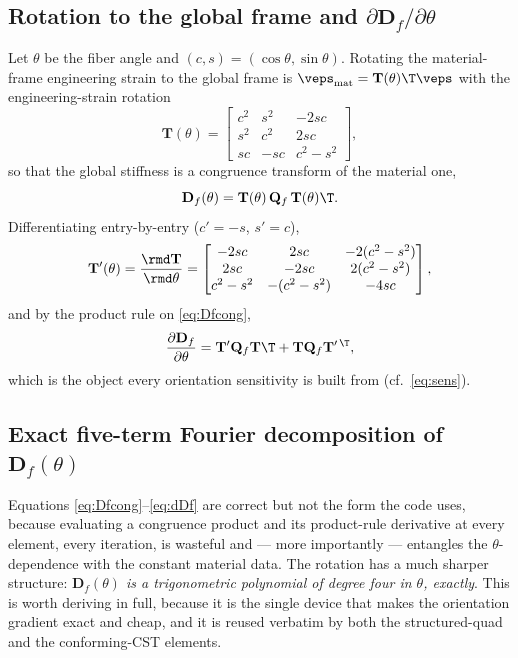 \documentclass[11pt]{article}
\begin{document}
\subsection{Rotation to the global frame and $\partial\mathbf D_f/\partial\theta$}
Let $\theta$ be the fiber angle and $(c,s)=(\cos\theta,\sin\theta)$. Rotating the
material-frame engineering strain to the global frame is $\veps_{\rm mat}=\mathbf
T(\theta)\T\veps$ with the engineering-strain rotation
\begin{equation}
  \mathbf T(\theta)=\begin{bmatrix} c^2 & s^2 & -2sc\\ s^2 & c^2 & 2sc\\
  sc & -sc & c^2-s^2\end{bmatrix},
\end{equation}
so that the global stiffness is a congruence transform of the material one,
\begin{equation}
  \mathbf D_f(\theta)=\mathbf T(\theta)\,\mathbf Q_f\,\mathbf T(\theta)\T .
  \label{eq:Dfcong}
\end{equation}
Differentiating entry-by-entry ($c'=-s$, $s'=c$),
\begin{equation}
  \mathbf T'(\theta)=\frac{\rmd\mathbf T}{\rmd\theta}
  =\begin{bmatrix} -2sc & 2sc & -2(c^2-s^2)\\ 2sc & -2sc & 2(c^2-s^2)\\
  c^2-s^2 & -(c^2-s^2) & -4sc\end{bmatrix},
\end{equation}
and by the product rule on \eqref{eq:Dfcong},
\begin{equation}
  \frac{\partial\mathbf D_f}{\partial\theta}
  =\mathbf T'\mathbf Q_f\mathbf T\T+\mathbf T\mathbf Q_f\mathbf T'^{\,\T},
  \label{eq:dDf}
\end{equation}
which is the object every orientation sensitivity is built from
(cf.\ \eqref{eq:sens}).

\subsection{Exact five-term Fourier decomposition of $\mathbf D_f(\theta)$}
\label{app:fourier}
Equations \eqref{eq:Dfcong}--\eqref{eq:dDf} are correct but not the form the code
uses, because evaluating a congruence product and its product-rule derivative at
every element, every iteration, is wasteful and --- more importantly --- entangles
the $\theta$-dependence with the constant material data. The rotation has a much
sharper structure: \emph{$\mathbf D_f(\theta)$ is a trigonometric polynomial of
degree four in $\theta$, exactly}. This is worth deriving in full, because it is the
single device that makes the orientation gradient exact and cheap, and it is reused
verbatim by both the structured-quad and the conforming-CST elements.
\end{document}
